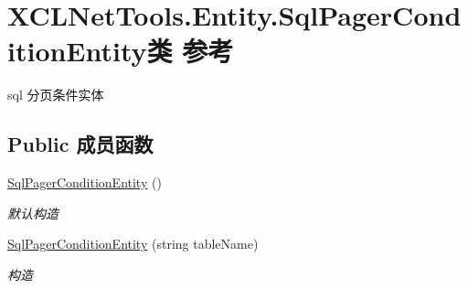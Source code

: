 \hypertarget{class_x_c_l_net_tools_1_1_entity_1_1_sql_pager_condition_entity}{\section{X\-C\-L\-Net\-Tools.\-Entity.\-Sql\-Pager\-Condition\-Entity类 参考}
\label{class_x_c_l_net_tools_1_1_entity_1_1_sql_pager_condition_entity}
}


sql 分页条件实体  


\subsection*{Public 成员函数}
\begin{DoxyCompactItemize}
\item 
\hyperlink{class_x_c_l_net_tools_1_1_entity_1_1_sql_pager_condition_entity_a8b6d71348a2cbfd9f609215a9d1af699}{Sql\-Pager\-Condition\-Entity} ()
\begin{DoxyCompactList}\small\item\em 默认构造 \end{DoxyCompactList}\item 
\hyperlink{class_x_c_l_net_tools_1_1_entity_1_1_sql_pager_condition_entity_a567e636eb71d4281f260cad017707cc9}{Sql\-Pager\-Condition\-Entity} (string table\-Name)
\begin{DoxyCompactList}\small\item\em 构造 \end{DoxyCompactList}\end{DoxyCompactItemize}
